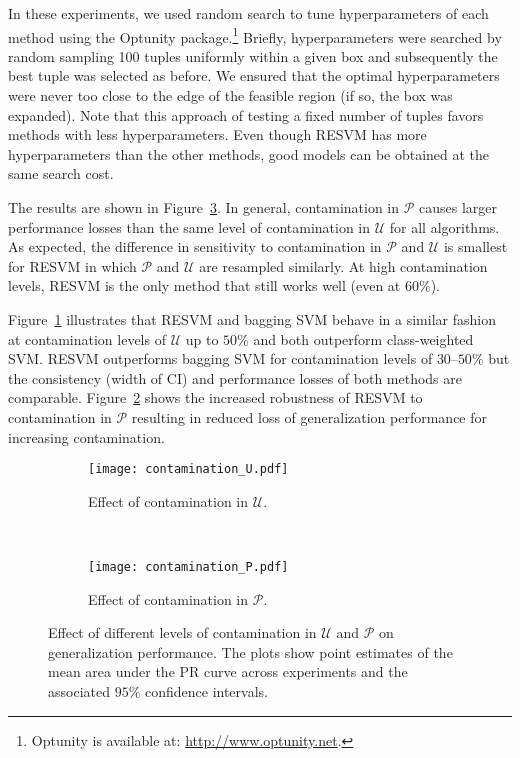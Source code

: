 \documentclass[preprint,elsarticle-num,12pt]{elsarticle}
\begin{document}
In these experiments, we used random search to tune hyperparameters of each method \citep{bergstra2012random} using the Optunity package.\footnote{Optunity is available at: \url{http://www.optunity.net}.} Briefly, hyperparameters were searched by random sampling 100 tuples uniformly within a given box and subsequently the best tuple was selected as before. We ensured that the optimal hyperparameters were never too close to the edge of the feasible region (if so, the box was expanded). Note that this approach of testing a fixed number of tuples favors methods with less hyperparameters. Even though RESVM has more hyperparameters than the other methods, good models can be obtained at the same search cost.

The results are shown in Figure~\ref{fig:contaminationeffect}. In general, contamination in $\mathcal{P}$ causes larger performance losses than the same level of contamination in $\mathcal{U}$ for all algorithms. As expected, the difference in sensitivity to contamination in $\mathcal{P}$ and $\mathcal{U}$ is smallest for RESVM in which $\mathcal{P}$ and $\mathcal{U}$ are resampled similarly. At high contamination levels, RESVM is the only method that still works well (even at $60\%$). 

Figure~\ref{fig:contaminationU} illustrates that RESVM and bagging SVM behave in a similar fashion at contamination levels of $\mathcal{U}$ up to $50\%$ and both outperform class-weighted SVM. RESVM outperforms bagging SVM for contamination levels of $30$--$50\%$ but the consistency (width of CI) and performance losses of both methods are comparable. Figure~\ref{fig:contaminationP} shows the increased robustness of RESVM to contamination in $\mathcal{P}$ resulting in reduced loss of generalization performance for increasing contamination. 

\begin{figure}[!ht]
  \centering
  \begin{subfigure}[b]{0.48\textwidth}
		\texttt{[image: contamination\_U.pdf]}
		\caption{Effect of contamination in $\mathcal{U}$.} \label{fig:contaminationU}
  \end{subfigure}
  ~
  \begin{subfigure}[b]{0.48\textwidth}
	  \texttt{[image: contamination\_P.pdf]}
		\caption{Effect of contamination in $\mathcal{P}$.} \label{fig:contaminationP}
  \end{subfigure}
  \caption{Effect of different levels of contamination in $\mathcal{U}$ and $\mathcal{P}$ on generalization performance. The plots show point estimates of the mean area under the PR curve across experiments and the associated $95\%$ confidence intervals.} 
  \label{fig:contaminationeffect}
\end{figure}
\end{document}
